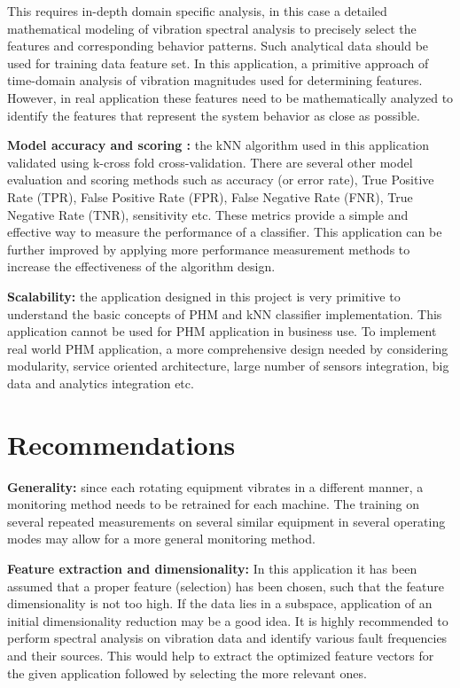\documentclass[sigconf]{acmart}
\begin{document}
This requires in-depth domain specific analysis, in this case a detailed mathematical modeling of vibration spectral analysis to precisely select the features and corresponding behavior patterns. Such analytical data should be used for training data feature set. In this application, a primitive approach of time-domain analysis of vibration magnitudes used for determining features. However, in real application these features need to be mathematically analyzed to identify the features that represent the system behavior as close as possible.

\textbf{Model accuracy and scoring :} the kNN algorithm used in this application validated using k-cross fold cross-validation. There are several other model evaluation and scoring methods such as accuracy (or error rate), True Positive Rate (TPR), False Positive Rate (FPR), False Negative Rate (FNR), True Negative Rate (TNR), sensitivity etc. These metrics provide a simple and effective way to measure the performance of a classifier. This application can be further improved by applying more performance measurement methods to increase the effectiveness of the algorithm design.   

\textbf{Scalability:} the application designed in this project is very primitive to understand the basic concepts of PHM and kNN classifier implementation. This application cannot be used for PHM application in business use. To implement real world PHM application, a more comprehensive design needed by considering modularity, service oriented architecture, large number of sensors integration, big data and analytics integration etc.

\section{Recommendations}
\textbf{Generality:} since each rotating equipment vibrates in a different manner, a monitoring method needs to be retrained for each machine. The training on several repeated measurements on several similar equipment in several operating modes may allow for a more general monitoring method.

\textbf{Feature extraction and dimensionality:} In this application it has been assumed that a proper feature (selection) has been chosen, such that the feature dimensionality is not too high. If the data lies in a subspace, application of an initial dimensionality reduction may be a good idea. It is highly recommended to perform spectral analysis on vibration data and identify various fault frequencies and their sources. This would help to extract the optimized feature vectors for the given application followed by selecting the more relevant ones. 
\end{document}
